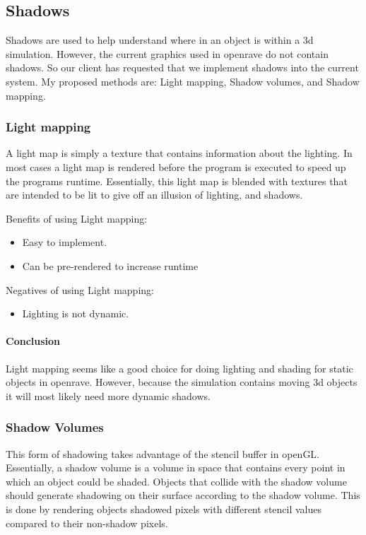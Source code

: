\documentclass[10pt,journal,compsoc,draftclsnofoot]{IEEEtran}
\begin{document}
\subsection{Shadows}
Shadows are used to help understand where in an object is within a 3d simulation.
However, the current graphics used in openrave do not contain shadows.
So our client has requested that we implement shadows into the current system.
My proposed methods are: Light mapping, Shadow volumes, and Shadow mapping.

\subsubsection{Light mapping}
A light map is simply a texture that contains information about the lighting. 
In most cases a light map is rendered before the program is executed to speed up the programs runtime.
Essentially, this light map is blended with textures that are intended to be lit to give off an illusion of lighting, and shadows.\cite{lightmapping}

Benefits of using Light mapping:
\begin{itemize}
\item Easy to implement.
\item Can be pre-rendered to increase runtime
\end{itemize}

Negatives of using Light mapping:
\begin{itemize}
\item Lighting is not dynamic.
\end{itemize}

\paragraph{Conclusion}
Light mapping seems like a good choice for doing lighting and shading for static objects in openrave.
However, because the simulation contains moving 3d objects it will most likely need more dynamic shadows.

\subsubsection{Shadow Volumes}
This form of shadowing takes advantage of the stencil buffer in openGL.
Essentially, a shadow volume is a volume in space that contains every point in which an object could be shaded.
Objects that collide with the shadow volume should generate shadowing on their surface according to the shadow volume.
This is done by rendering objects shadowed pixels with different stencil values compared to their non-shadow pixels. \cite{volume}
\end{document}
